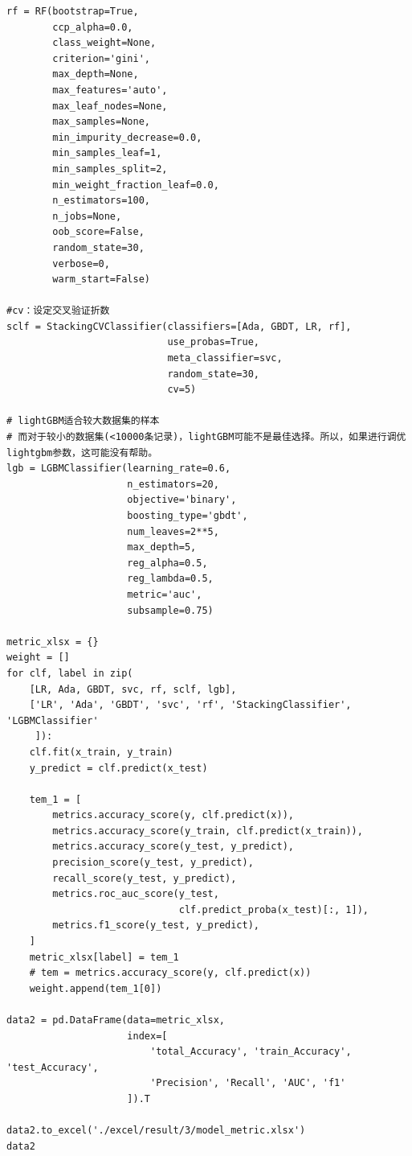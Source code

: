 \documentclass[UTF8]{ctexart}
\begin{document}
\begin{lstlisting}
rf = RF(bootstrap=True,
        ccp_alpha=0.0,
        class_weight=None,
        criterion='gini',
        max_depth=None,
        max_features='auto',
        max_leaf_nodes=None,
        max_samples=None,
        min_impurity_decrease=0.0,
        min_samples_leaf=1,
        min_samples_split=2,
        min_weight_fraction_leaf=0.0,
        n_estimators=100,
        n_jobs=None,
        oob_score=False,
        random_state=30,
        verbose=0,
        warm_start=False)

#cv：设定交叉验证折数
sclf = StackingCVClassifier(classifiers=[Ada, GBDT, LR, rf],
                            use_probas=True,
                            meta_classifier=svc,
                            random_state=30,
                            cv=5)

# lightGBM适合较大数据集的样本
# 而对于较小的数据集(<10000条记录)，lightGBM可能不是最佳选择。所以，如果进行调优lightgbm参数，这可能没有帮助。
lgb = LGBMClassifier(learning_rate=0.6,
                     n_estimators=20,
                     objective='binary',
                     boosting_type='gbdt',
                     num_leaves=2**5,
                     max_depth=5,
                     reg_alpha=0.5,
                     reg_lambda=0.5,
                     metric='auc',
                     subsample=0.75)

metric_xlsx = {}
weight = []
for clf, label in zip(
    [LR, Ada, GBDT, svc, rf, sclf, lgb],
    ['LR', 'Ada', 'GBDT', 'svc', 'rf', 'StackingClassifier', 'LGBMClassifier'
     ]):
    clf.fit(x_train, y_train)
    y_predict = clf.predict(x_test)

    tem_1 = [
        metrics.accuracy_score(y, clf.predict(x)),
        metrics.accuracy_score(y_train, clf.predict(x_train)),
        metrics.accuracy_score(y_test, y_predict),
        precision_score(y_test, y_predict),
        recall_score(y_test, y_predict),
        metrics.roc_auc_score(y_test,
                              clf.predict_proba(x_test)[:, 1]),
        metrics.f1_score(y_test, y_predict),
    ]
    metric_xlsx[label] = tem_1
    # tem = metrics.accuracy_score(y, clf.predict(x))
    weight.append(tem_1[0])

data2 = pd.DataFrame(data=metric_xlsx,
                     index=[
                         'total_Accuracy', 'train_Accuracy', 'test_Accuracy',
                         'Precision', 'Recall', 'AUC', 'f1'
                     ]).T

data2.to_excel('./excel/result/3/model_metric.xlsx')
data2


\end{lstlisting}
\end{document}
